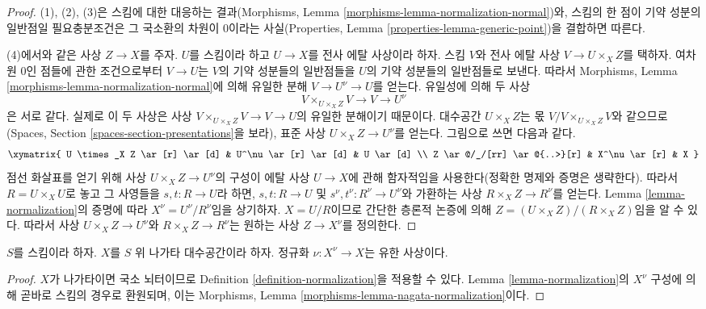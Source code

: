 \begin{proof}
(1), (2), (3)은 스킴에 대한 대응하는 결과(Morphisms, Lemma
\ref{morphisms-lemma-normalization-normal})와, 스킴의 한 점이 기약 성분의
일반점일 필요충분조건은 그 국소환의 차원이 0이라는 사실(Properties,
Lemma \ref{properties-lemma-generic-point})을 결합하면 따른다.

\medskip\noindent
(4)에서와 같은 사상 $Z \to X$를 주자. $U$를 스킴이라 하고
$U \to X$를 전사 에탈 사상이라 하자. 스킴 $V$와 전사 에탈 사상
$V \to U \times_X Z$를 택하자. 여차원 $0$인 점들에 관한 조건으로부터
$V \to U$는 $V$의 기약 성분들의 일반점들을 $U$의 기약 성분들의
일반점들로 보낸다. 따라서 Morphisms, Lemma
\ref{morphisms-lemma-normalization-normal}에 의해 유일한 분해
$V \to U^\nu \to U$를 얻는다. 유일성에 의해 두 사상
$$
V \times_{U \times_X Z} V \to V \to U^\nu
$$
은 서로 같다. 실제로 이 두 사상은 사상
$V \times_{U \times_X Z} V \to V \to U$의 유일한 분해이기 때문이다.
대수공간 $U \times_X Z$는 몫
$V/V \times_{U \times_X Z} V$와 같으므로
(Spaces, Section \ref{spaces-section-presentations}을 보라), 표준 사상
$U \times_X Z \to U^\nu$를 얻는다. 그림으로 쓰면 다음과 같다.
$$
\xymatrix{
U \times_X Z \ar[r] \ar[d] & U^\nu \ar[r] \ar[d] & U \ar[d] \\
Z \ar@/_/[rr] \ar@{..>}[r] & X^\nu \ar[r] & X
}
$$
점선 화살표를 얻기 위해 사상 $U \times_X Z \to U^\nu$의 구성이 에탈
사상 $U \to X$에 관해 함자적임을 사용한다(정확한 명제와 증명은
생략한다). 따라서 $R = U \times_X U$로 놓고 그 사영들을
$s, t : R \to U$라 하면, $s, t : R \to U$ 및
$s^\nu, t^\nu : R^\nu \to U^\nu$와 가환하는 사상
$R \times_X Z \to R^\nu$를 얻는다. Lemma
\ref{lemma-normalization}의 증명에 따라 $X^\nu = U^\nu/R^\nu$임을
상기하자.
$X = U/R$이므로 간단한 층론적 논증에 의해
$Z = (U \times_X Z)/(R \times_X Z)$임을 알 수 있다. 따라서 사상
$U \times_X Z \to U^\nu$와 $R \times_X Z \to R^\nu$는 원하는 사상
$Z \to X^\nu$를 정의한다.
\end{proof}

\begin{lemma}
\label{lemma-nagata-normalization}
$S$를 스킴이라 하자. $X$를 $S$ 위 나가타 대수공간이라 하자. 정규화
$\nu : X^\nu \to X$는 유한 사상이다.
\end{lemma}

\begin{proof}
$X$가 나가타이면 국소 뇌터이므로 Definition
\ref{definition-normalization}을 적용할 수 있다. Lemma
\ref{lemma-normalization}의 $X^\nu$ 구성에 의해 곧바로 스킴의 경우로
환원되며, 이는 Morphisms, Lemma
\ref{morphisms-lemma-nagata-normalization}이다.
\end{proof}

